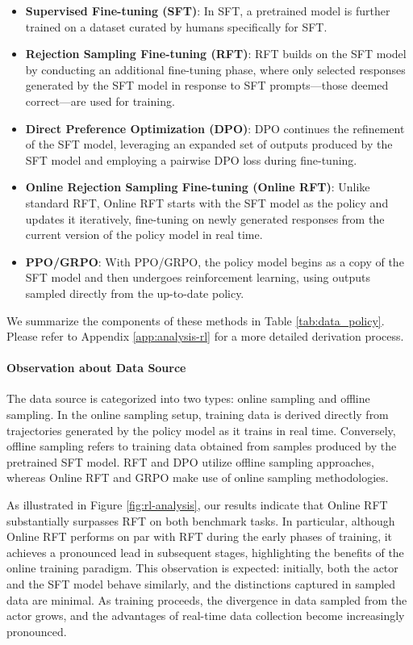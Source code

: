 \begin{itemize}[topsep=0pt]
\begin{itemize}[topsep=0pt]
\begin{itemize}
    \item \textbf{Supervised Fine-tuning (SFT)}: In SFT, a pretrained model is further trained on a dataset curated by humans specifically for SFT.
    \item \textbf{Rejection Sampling Fine-tuning (RFT)}: RFT builds on the SFT model by conducting an additional fine-tuning phase, where only selected responses generated by the SFT model in response to SFT prompts—those deemed correct—are used for training.
    \item \textbf{Direct Preference Optimization (DPO)}: DPO continues the refinement of the SFT model, leveraging an expanded set of outputs produced by the SFT model and employing a pairwise DPO loss during fine-tuning.
    \item \textbf{Online Rejection Sampling Fine-tuning (Online RFT)}: Unlike standard RFT, Online RFT starts with the SFT model as the policy and updates it iteratively, fine-tuning on newly generated responses from the current version of the policy model in real time.
    \item \textbf{PPO/GRPO}: With PPO/GRPO, the policy model begins as a copy of the SFT model and then undergoes reinforcement learning, using outputs sampled directly from the up-to-date policy.
\end{itemize}

We summarize the components of these methods in Table \ref{tab:data_policy}.
Please refer to Appendix \ref{app:analysis-rl} for a more detailed derivation process.

\paragraph{Observation about Data Source} The data source is categorized into two types: online sampling and offline sampling. In the online sampling setup, training data is derived directly from trajectories generated by the policy model as it trains in real time. Conversely, offline sampling refers to training data obtained from samples produced by the pretrained SFT model. RFT and DPO utilize offline sampling approaches, whereas Online RFT and GRPO make use of online sampling methodologies.

As illustrated in Figure \ref{fig:rl-analysis}, our results indicate that Online RFT substantially surpasses RFT on both benchmark tasks. In particular, although Online RFT performs on par with RFT during the early phases of training, it achieves a pronounced lead in subsequent stages, highlighting the benefits of the online training paradigm. This observation is expected: initially, both the actor and the SFT model behave similarly, and the distinctions captured in sampled data are minimal. As training proceeds, the divergence in data sampled from the actor grows, and the advantages of real-time data collection become increasingly pronounced.


\end{itemize}
\end{itemize}
